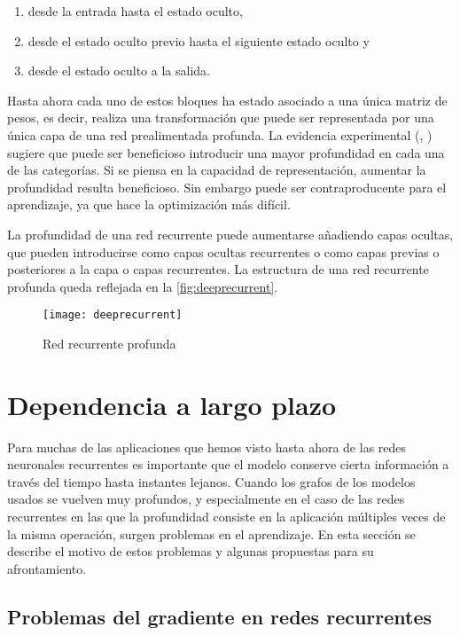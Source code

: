 \begin{enumerate}
\item desde la entrada hasta el estado oculto,
\item desde el estado oculto previo hasta el siguiente estado oculto y
\item desde el estado oculto a la salida.
\end{enumerate}

Hasta ahora cada uno de estos bloques ha estado asociado a una única matriz de pesos, es decir, realiza una transformación que puede ser representada por una única capa de una red prealimentada profunda. La evidencia experimental (\cite{graves2013speech}, \cite{pascanu2013construct}) sugiere que puede ser beneficioso introducir una mayor profundidad en cada una de las categorías. Si se piensa en la capacidad de representación, aumentar la profundidad resulta beneficioso. Sin embargo puede ser contraproducente para el aprendizaje, ya que hace la optimización más difícil.

La profundidad de una red recurrente puede aumentarse añadiendo capas ocultas, que pueden introducirse como capas ocultas recurrentes o como capas previas o posteriores a la capa o capas recurrentes. La estructura de una red recurrente profunda queda reflejada en la \autoref{fig:deeprecurrent}.

\begin{figure}[htpb]
  \centering
  \texttt{[image: deeprecurrent]}
  \caption{Red recurrente profunda}
  \label{fig:deeprecurrent}
\end{figure}

\section{Dependencia a largo plazo}

Para muchas de las aplicaciones que hemos visto hasta ahora de las redes neuronales recurrentes es importante que el modelo conserve cierta información a través del tiempo hasta instantes lejanos. Cuando los grafos de los modelos usados se vuelven muy profundos, y especialmente en el caso de las redes recurrentes en las que la profundidad consiste en la aplicación múltiples veces de la misma operación, surgen problemas en el aprendizaje. En esta sección se describe el motivo de estos problemas y algunas propuestas para su afrontamiento.

\subsection{Problemas del gradiente en redes recurrentes}


